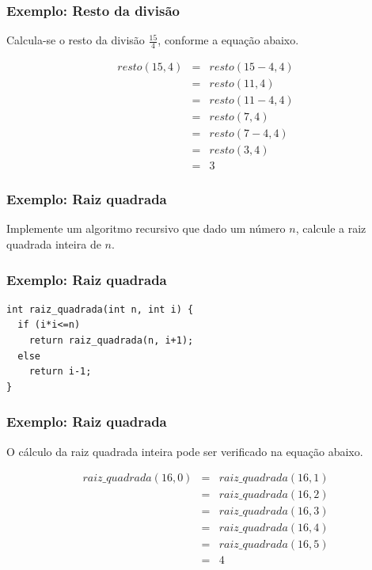 \documentclass[aspectratio=169]{beamer}
\begin{document}
\begin{frame}[fragile]
\frametitle{Exemplo: Resto da divisão}
Calcula-se o resto da divisão $\frac{15}{4}$, conforme a equação abaixo.

\begin{eqnarray}
  resto(15,4)&=& resto(15-4,4) \nonumber \\
                &=& resto(11,4) \nonumber \\
	        &=& resto(11-4,4) \nonumber \\
	        &=& resto(7,4) \nonumber \\
	        &=& resto(7-4,4) \nonumber \\
	        &=& resto(3,4) \nonumber \\
	        &=& 3 \nonumber
\end{eqnarray}
\end{frame}


\begin{frame}
\frametitle{Exemplo: Raiz quadrada}
Implemente um algoritmo recursivo que dado um número $n$, calcule a raiz quadrada inteira de $n$.
\end{frame}


\begin{frame}[fragile]
\frametitle{Exemplo: Raiz quadrada}
\begin{lstlisting}
int raiz_quadrada(int n, int i) {
  if (i*i<=n)
    return raiz_quadrada(n, i+1);  
  else 
    return i-1;
}
\end{lstlisting}
\end{frame}



\begin{frame}[fragile]
\frametitle{Exemplo: Raiz quadrada}
O cálculo da raiz quadrada inteira pode ser verificado na equação abaixo.

\begin{eqnarray}
  raiz\_quadrada(16,0)&=& raiz\_quadrada(16,1) \nonumber \\
                &=& raiz\_quadrada(16,2) \nonumber \\
	        &=& raiz\_quadrada(16,3) \nonumber \\
	        &=& raiz\_quadrada(16,4) \nonumber \\
	        &=& raiz\_quadrada(16,5) \nonumber \\
	        &=& 4 \nonumber
\label{calculo_raiz_quadrada}
\end{eqnarray}
\end{frame}
\end{document}
